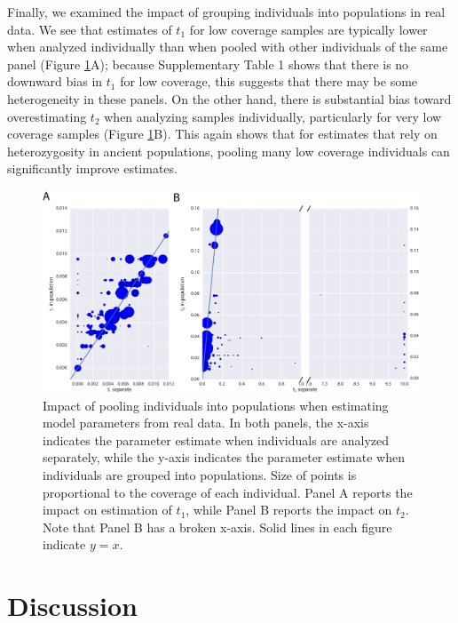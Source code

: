 \documentclass[11pt, oneside]{article}   	%
\begin{document}
Finally, we examined the impact of grouping individuals into populations in real data.  We see that estimates of $t_1$ for low coverage samples are typically lower when analyzed individually than when pooled with other individuals of the same panel (Figure \ref{sep_vs_pops}A); because Supplementary Table 1 shows that there is no downward bias in $t_1$ for low coverage, this suggests that there may be some heterogeneity in these panels. On the other hand, there is substantial bias toward overestimating $t_2$ when analyzing samples individually, particularly for very low coverage samples (Figure \ref{sep_vs_pops}B). This again shows that for estimates that rely on heterozygosity in ancient populations, pooling many low coverage individuals can significantly improve estimates.

\begin{figure}[!h] %
   \centering
   \includegraphics[width=\textwidth]{sep_vs_pops.pdf} 
   \caption{Impact of pooling individuals into populations when estimating model parameters from real data. In both panels, the x-axis indicates the parameter estimate when individuals are analyzed separately, while the y-axis indicates the parameter estimate when individuals are grouped into populations. Size of points is proportional to the coverage of each individual. Panel A reports the impact on estimation of $t_1$, while Panel B reports the impact on $t_2$. Note that Panel B has a broken x-axis. Solid lines in each figure indicate $y = x$.}
   \label{sep_vs_pops}
\end{figure}

\section{Discussion}
\end{document}

